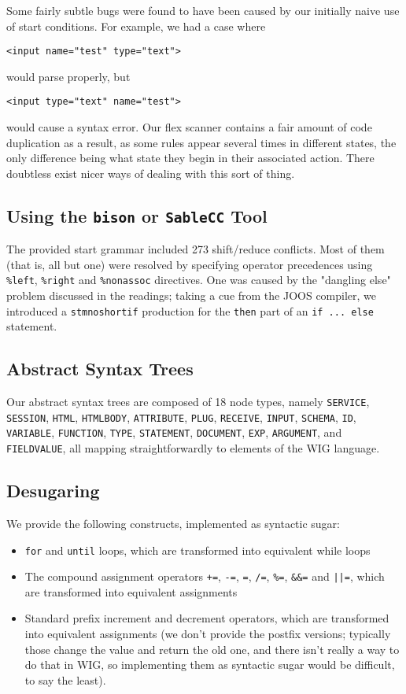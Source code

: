 \documentclass{WigReport}
\begin{document}
Some fairly subtle bugs were found to have been caused by our initially
naive use of start conditions. For example, we had a case where

{\tt <input name="test" type="text">}

would parse properly, but

{\tt <input type="text" name="test">}

would cause a syntax error. Our flex scanner contains a fair amount of
code duplication as a result, as some rules appear several times in
different states, the only difference being what state they begin in their 
associated action. There doubtless exist nicer ways of dealing with this 
sort of thing.

\subsection{Using the {\tt bison} or {\tt SableCC} Tool}
The provided start grammar included 273 shift/reduce conflicts. Most of
them (that is, all but one) were resolved by specifying operator
precedences using {\tt \%left}, {\tt \%right} and {\tt \%nonassoc} 
directives.  One was caused by the "dangling else" problem discussed in the
readings; taking a cue from the JOOS compiler, we introduced a 
{\tt stmnoshortif} production for the {\tt then} part of an 
{\tt if ...  else} statement.

\subsection{Abstract Syntax Trees}
Our abstract syntax trees are composed of 18 node types, namely
{\tt SERVICE}, {\tt SESSION}, {\tt HTML}, {\tt HTMLBODY}, {\tt ATTRIBUTE}, 
{\tt PLUG}, {\tt RECEIVE}, {\tt INPUT}, {\tt SCHEMA}, {\tt ID}, 
{\tt VARIABLE}, {\tt FUNCTION}, {\tt TYPE}, {\tt STATEMENT}, 
{\tt DOCUMENT}, {\tt EXP}, {\tt ARGUMENT}, and {\tt FIELDVALUE}, all mapping
straightforwardly to elements of the WIG language.

\subsection{Desugaring}
We provide the following constructs, implemented as syntactic sugar:

\begin{itemize}
\item {\tt for} and {\tt until} loops, which are transformed into 
equivalent while loops
\item The compound assignment operators {\tt +=}, {\tt -=}, {\tt *=},
{\tt /=}, {\tt \%=}, {\tt \&\&=} and {\tt ||=}, which are transformed into
equivalent assignments
\item Standard prefix increment and decrement operators, which are 
transformed into equivalent assignments (we don't provide the postfix
versions; typically those change the value and return the old one, and
there isn't really a way to do that in WIG, so implementing them as
syntactic sugar would be difficult, to say the least).
\end{itemize}
\end{document}
